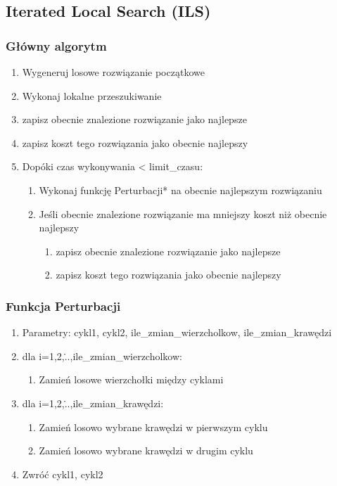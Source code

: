 \documentclass[11pt]{article}
\begin{document}
\subsection{Iterated Local Search (ILS)}\label{subsec:ils}

\subsubsection{Główny algorytm}
\begin{enumerate}
    \item Wygeneruj losowe rozwiązanie początkowe
    \item Wykonaj lokalne przeszukiwanie
    \item zapisz obecnie znalezione rozwiązanie jako najlepsze
    \item zapisz koszt tego rozwiązania jako obecnie najlepszy
    \item Dopóki czas wykonywania < limit\_czasu:
        \begin{enumerate}
            \item Wykonaj funkcję Perturbacji* na obecnie najlepszym rozwiązaniu
            \item Jeśli obecnie znalezione rozwiązanie ma mniejszy koszt niż obecnie najlepszy
                \begin{enumerate}
                    \item zapisz obecnie znalezione rozwiązanie jako najlepsze
                    \item zapisz koszt tego rozwiązania jako obecnie najlepszy
                \end{enumerate}
        \end{enumerate}
\end{enumerate}

\subsubsection{Funkcja Perturbacji}
\begin{enumerate}
    \item Parametry: cykl1, cykl2, ile\_zmian\_wierzcholkow, ile\_zmian\_krawędzi
    \item dla i=1,2,\...,ile\_zmian\_wierzcholkow:
        \begin{enumerate}
            \item Zamień losowe wierzchołki między cyklami
        \end{enumerate}

    \item dla i=1,2,\...,ile\_zmian\_krawędzi:
        \begin{enumerate}
            \item Zamień losowo wybrane krawędzi w pierwszym cyklu
            \item Zamień losowo wybrane krawędzi w drugim cyklu
        \end{enumerate}
    \item Zwróć cykl1, cykl2
\end{enumerate}
\end{document}
